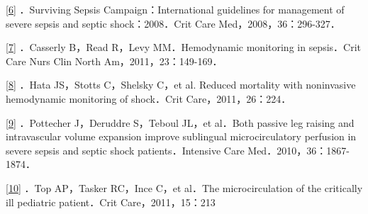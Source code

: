 \protect\hyperlink{text00010.htmlux5cux23ch6-9-back}{{[}6{]}}
．Surviving Sepsis Campaign：International guidelines for management of
severe sepsis and septic shock：2008．Crit Care Med，2008，36：296-327．

\protect\hyperlink{text00010.htmlux5cux23ch7-9-back}{{[}7{]}} ．Casserly
B，Read R，Levy MM．Hemodynamic monitoring in sepsis．Crit Care Nurs
Clin North Am，2011，23：149-169．

\protect\hyperlink{text00010.htmlux5cux23ch8-9-back}{{[}8{]}} ．Hata
JS，Stotts C，Shelsky C，et al. Reduced mortality with noninvasive
hemodynamic monitoring of shock．Crit Care，2011，26：224．

\protect\hyperlink{text00010.htmlux5cux23ch9-9-back}{{[}9{]}}
．Pottecher J，Deruddre S，Teboul JL，et al．Both passive leg raising
and intravascular volume expansion improve sublingual microcirculatory
perfusion in severe sepsis and septic shock patients．Intensive Care
Med．2010，36：1867-1874．

\protect\hyperlink{text00010.htmlux5cux23ch10-9-back}{{[}10{]}} ．Top
AP，Tasker RC，Ince C，et al．The microcirculation of the critically ill
pediatric patient．Crit Care，2011，15：213

\protect\hypertarget{text00011.html}{}{}

